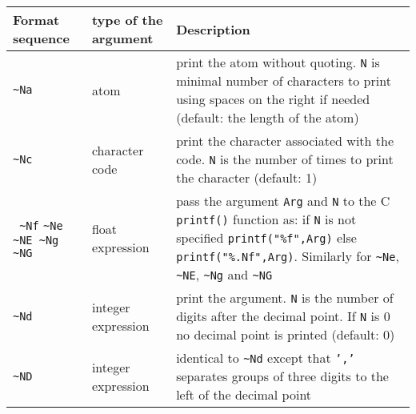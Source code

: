 \begin{tabular}{|C{1.4cm}|C{2.8cm}|p{10.45cm}|}
\hline

Format sequence  & type of the argument & Description \\

\hline\hline

\texttt{\~{}Na} & atom & print the atom without quoting. \texttt{N} is minimal
                         number of characters to print using spaces on the right
                         if needed (default: the length of the atom) \\

\hline

\texttt{\~{}Nc} & character code & print the character associated with the
                                   code. \texttt{N} is the number of times to
                                   print the character (default: 1)\\

\hline

\texttt{ \~{}Nf}
\linebreak
\texttt{\~{}Ne \~{}NE \~{}Ng \~{}NG}
               &  float expression & pass the argument \texttt{Arg} and
                                     \texttt{N} to the C \texttt{printf()}
                                     function as:
\linebreak
                               if \texttt{N} is not specified
                               \texttt{printf("\%f",Arg)} else
                               \texttt{printf("\%.Nf",Arg)}.
\linebreak
                                     Similarly for \texttt{\~{}Ne}, \texttt{\~{}NE},
                                     \texttt{\~{}Ng} and \texttt{\~{}NG} \\

\hline

\texttt{\~{}Nd} & integer expression & print the argument. \texttt{N} is the
                                       number of digits after the decimal point.
                                       If \texttt{N} is 0 no decimal point is printed (default: 0)\\

\hline

\texttt{\~{}ND} & integer expression & identical to \texttt{\~{}Nd} except
                                       that \texttt{','} separates groups of
                                       three digits to the left of the
                                       decimal point \\


\end{tabular}
